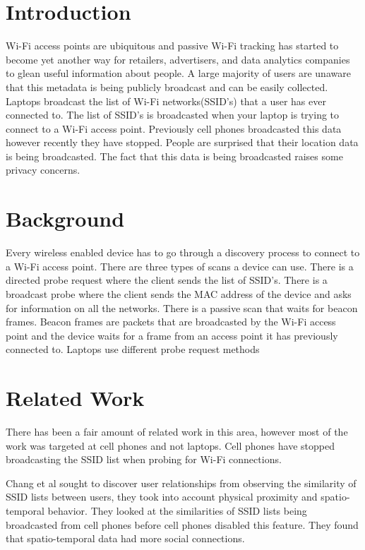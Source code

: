 \documentclass[letterpaper,twocolumn,10pt]{article}
\begin{document}
\section{Introduction}
Wi-Fi access points are ubiquitous and passive Wi-Fi tracking has started to become yet another way for retailers, advertisers, and data analytics companies to glean useful information about people. A large majority of users are unaware that this metadata is being publicly broadcast and can be easily collected. 
Laptops broadcast the list of Wi-Fi networks(SSID's) that a user has ever connected to. The list of SSID's is broadcasted when your laptop is trying to connect to a Wi-Fi access point. Previously cell phones broadcasted this data however recently they have stopped. People are surprised that their location data is being broadcasted. The fact that this data is being broadcasted raises some privacy concerns.

\section{Background}

Every wireless enabled device has to go through a discovery process to connect to a Wi-Fi access point. There are three types of scans a device can use. There is a directed probe request where the client sends the list of SSID's. There is a broadcast probe where the client sends the MAC address of the device and asks for information on all the networks. There is a passive scan that waits for beacon frames. Beacon frames are packets that are broadcasted by the Wi-Fi access point and the device waits for a frame from an access point it has previously connected to. Laptops use different probe request methods 

\section{Related Work}
There has been a fair amount of related work in this area, however most of the work was targeted at cell phones and not laptops. Cell phones have stopped broadcasting the SSID list when probing for Wi-Fi connections.

Chang et al  sought to discover user relationships from observing the similarity of SSID lists between users, they took into account physical proximity and spatio-temporal behavior. They looked at the similarities of SSID lists being broadcasted from cell phones before cell phones disabled this feature. They found that spatio-temporal data had more social connections. 
\end{document}
